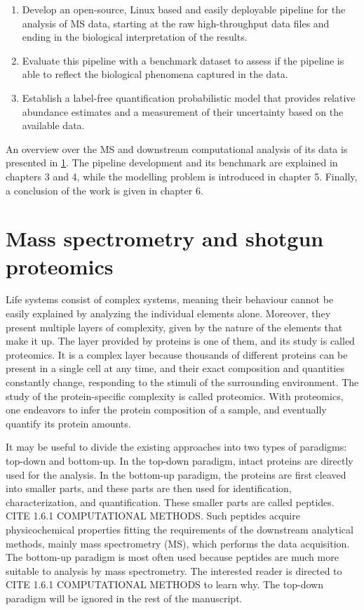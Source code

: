 \documentclass[11pt, a4paper]{report}
\begin{document}
\begin{enumerate}

\item Develop an open-source, Linux based and easily deployable pipeline for the analysis of \ac{MS} data, starting at the raw high-throughput data files and ending in the  biological interpretation of the results.

\item Evaluate this pipeline with a benchmark dataset to assess if the pipeline is able to reflect the biological phenomena captured in the data.

\item Establish a label-free quantification probabilistic model that provides relative abundance estimates and a measurement of their uncertainty based on the available data.

\end{enumerate}

An overview over the \ac{MS} and downstream computational analysis of its data is presented in \ref{chap:mass_spec}. The pipeline development and its benchmark are explained in chapters 3 and 4, while the modelling problem is introduced in chapter 5. Finally, a conclusion of the work is given in chapter 6.


\chapter{Mass spectrometry and shotgun proteomics}
\label{chap:mass_spec}

Life systems consist of complex systems, meaning their behaviour cannot be easily explained by analyzing the individual elements alone. Moreover, they present multiple layers of complexity, given by the nature of the elements that make it up. The layer provided by proteins is one of them, and its study is called proteomics. It is a complex layer because thousands of different proteins can be present in a single cell at any time, and their exact composition and quantities constantly change, responding to the stimuli of the surrounding environment. The study of the protein-specific complexity is called proteomics. With proteomics, one endeavors to infer the protein composition of a sample, and eventually quantify its protein amounts.

It may be useful to divide the existing approaches into two types of paradigms: top-down and bottom-up. In the top-down paradigm, intact proteins are directly used for the analysis. In the bottom-up paradigm, the proteins are first cleaved into smaller parts, and these parts are then used for identification, characterization, and quantification. These smaller parts are called peptides. CITE 1.6.1 COMPUTATIONAL METHODS. Such peptides acquire physicochemical properties fitting the requirements of the downstream analytical methods, mainly mass spectrometry (MS), which performs the data acquisition. The bottom-up paradigm is most often used because peptides are much more suitable to analysis by mass spectrometry. The interested reader is directed to CITE 1.6.1 COMPUTATIONAL METHODS to learn why. The top-down paradigm will be ignored in the rest of the manuscript.
\end{document}
